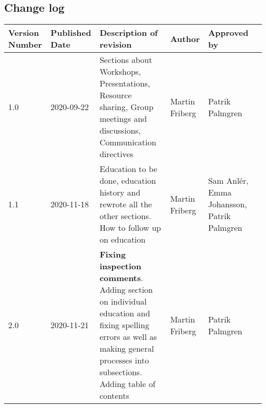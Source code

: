 \documentclass[12pt]{article}
\begin{document}
    
    
\clearpage

    
     
    {
 
        \renewcommand{\contentsname}{Innehåll}
        \tableofcontents
    }
    
    
    \newpage
    
   \begin{flushleft} \section{Change log}
   \end{flushleft}
    \begin{center}
    


\begin{tabular}{ | m{5em} | m{5em}| m{10em} |m{5em}| m{5em} |m{5em} |  } 
\hline
Version Number& Published Date & Description of revision & Author & Approved by \\ 
\hline
1.0 & 2020-09-22 & Sections about Workshops, Presentations, Resource sharing, Group meetings and discussions, Communication directives & Martin Friberg & Patrik Palmgren \\
\hline
1.1 & 2020-11-18 & Education to be done, education history and rewrote all the other sections. How to follow up on education & Martin Friberg & Sam Anlér, Emma Johansson, Patrik Palmgren \\
\hline
2.0 & 2020-11-21 & \textbf{Fixing inspection comments}. Adding section on individual education and fixing spelling errors as well as making general processes into subsections. Adding table of contents & Martin Friberg & Patrik Palmgren \\
\hline

\end{tabular}
\end{center}
            
\newpage

    
\end{document}
